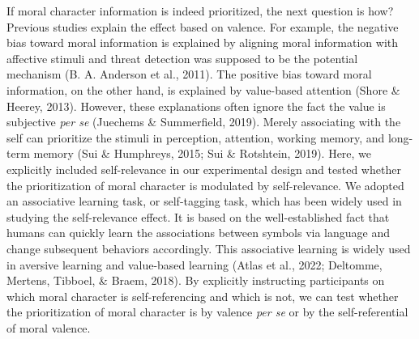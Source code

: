 \documentclass[
  man]{apa6}
\begin{document}
If moral character information is indeed prioritized, the next question is how? Previous studies explain the effect based on valence. For example, the negative bias toward moral information is explained by aligning moral information with affective stimuli and threat detection was supposed to be the potential mechanism (B. A. Anderson et al., 2011). The positive bias toward moral information, on the other hand, is explained by value-based attention (Shore \& Heerey, 2013). However, these explanations often ignore the fact the value is subjective \emph{per se} (Juechems \& Summerfield, 2019). Merely associating with the self can prioritize the stimuli in perception, attention, working memory, and long-term memory (Sui \& Humphreys, 2015; Sui \& Rotshtein, 2019). Here, we explicitly included self-relevance in our experimental design and tested whether the prioritization of moral character is modulated by self-relevance. We adopted an associative learning task, or self-tagging task, which has been widely used in studying the self-relevance effect. It is based on the well-established fact that humans can quickly learn the associations between symbols via language and change subsequent behaviors accordingly. This associative learning is widely used in aversive learning and value-based learning (Atlas et al., 2022; Deltomme, Mertens, Tibboel, \& Braem, 2018). By explicitly instructing participants on which moral character is self-referencing and which is not, we can test whether the prioritization of moral character is by valence \emph{per se} or by the self-referential of moral valence.
\end{document}
